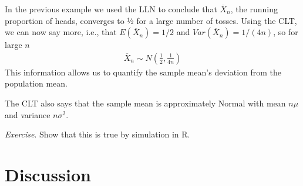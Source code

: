 \documentclass[11pt,a4paper]{article}
\begin{document}
In the previous example we used the LLN to conclude that \({\overline{X}}_{n}\), 
the running proportion of heads, 
converges to ½ for a large number of tosses. 
Using the CLT, 
we can now say more, i.e.,
that \(E\left( {\overline{X}}_{n} \right) = 1/2\) and
\(Var\left( {\overline{X}}_{n} \right) = 1/(4n)\), so for large \(n\)
\begin{align}
{\overline{X}}_{n} \sim N\left( \frac{1}{2},\frac{1}{4n} \right)
\end{align}
This information allows us to quantify the sample mean's deviation from the population mean.

The CLT also says that the sample mean is approximately Normal with mean
\(n\mu\) and variance \(n\sigma^{2}\). 

\emph{Exercise}. 
Show that this is true by simulation in R.

\newpage
\section{Discussion}
\end{document}
